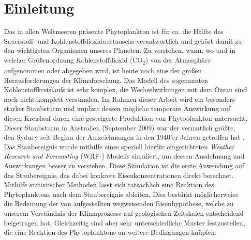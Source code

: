 \documentclass[12pt,a4paper,onecolumn,headheight=30pt]{scrartcl}
\newcommand{\cotwo}{CO\textsubscript{2}}
\begin{document}
\section{Einleitung} \label{sec:einleitung}
\sloppy %
Das in allen Weltmeeren präsente Phytoplankton ist für ca. die Hälfte des Sauerstoff- und Kohlenstoffdioxidaustauschs verantwortlich \citep{Emerson.2009} und gehört damit zu den wichtigsten Organismen unseres Planeten. Zu verstehen, wann, wo und in welcher Größenordnung Kohlenstoffdioxid (\cotwo) von der Atmosphäre aufgenommen oder abgegeben wird, ist heute noch eine der großen Herausforderungen der Klimaforschung. Das Modell des sogenannten Kohlenstoffkreislaufs ist sehr komplex, die Wechselwirkungen mit dem Ozean sind noch nicht komplett verstanden. Im Rahmen dieser Arbeit wird ein besonders starker Staubsturm und implizit dessen mögliche temporäre Auswirkung auf diesen Kreislauf durch eine gesteigerte Produktion von Phytoplankton untersucht. Dieser Staubsturm in Australien (September 2009) war der vermutlich größte, den Sydney seit Beginn der Aufzeichnungen in den 1940'er Jahren getroffen hat \citep{Leys.2011}. Das Staubereignis wurde mithilfe eines speziell hierfür eingerichteten \textit{Weather Research and Forecasting} (WRF-) Modells simuliert, um dessen Ausdehnung und Auswirkungen besser zu verstehen. Diese Simulation ist die erste Anwendung auf das Staubereignis, das dabei konkrete Eisenkonzentrationen direkt berechnet. Mithilfe statistischer Methoden lässt sich tatsächlich eine Reaktion des Phytoplanktons nach dem Staubereignis ableiten. Dies bestärkt möglicherweise die Bedeutung der von \citet{Martin.1990} aufgestellten wegweisenden Eisenhypothese, welche zu unserem Verständnis der Klimaprozesse auf geologischen Zeitskalen entscheidend beigetragen hat. Gleichzeitig sind aber sehr unterschiedliche Muster festzustellen, die eine Reaktion des Phytoplanktons an weitere Bedingungen knüpfen.
\end{document}
